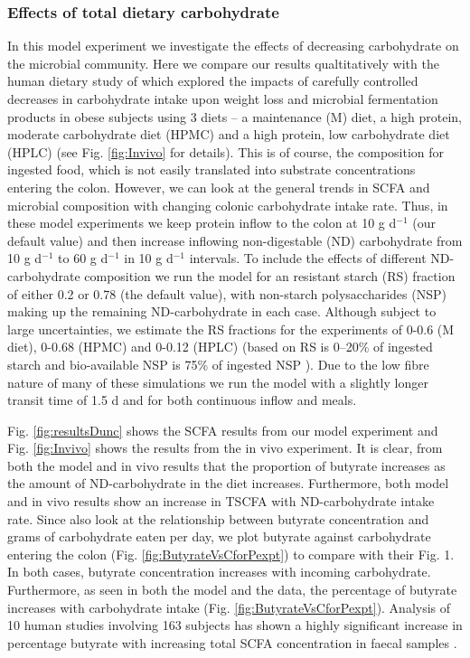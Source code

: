 \documentclass[a4paper]{article}
\begin{document}
\subsubsection*{Effects of total dietary carbohydrate}
\label{sect:protein}
In this model experiment we investigate the effects of decreasing carbohydrate on the microbial community. 
Here we compare our results qualtitatively with the human dietary study of \cite{duncan} which explored the impacts of carefully controlled decreases in carbohydrate intake upon weight loss and microbial fermentation products in obese subjects using 3 diets -- a maintenance (M) diet, a high protein, moderate carbohydrate diet (HPMC) and a high protein, low carbohydrate diet (HPLC) (see Fig. \ref{fig:Invivo} for details).
This is of course, the composition for ingested food, which is not easily translated into substrate concentrations entering the colon. 
However, we can look at the general trends in SCFA and microbial composition with changing colonic carbohydrate intake rate.
Thus, in these model experiments we keep protein inflow to the colon at 10 g d$^{-1}$ (our default value) and then increase inflowing non-digestable (ND) carbohydrate from 10 g d$^{-1}$ to 60 g d$^{-1}$ in 10 g d$^{-1}$ intervals. 
To include the effects of different ND-carbohydrate composition we run the model for an resistant starch (RS) fraction of either 0.2 or 0.78 (the default value), with non-starch polysaccharides (NSP) making up the remaining ND-carbohydrate in each case. 
Although subject to large uncertainties, we estimate the RS fractions for the \cite{duncan} experiments of 0-0.6 (M diet), 0-0.68 (HPMC) and 0-0.12 (HPLC) (based on RS is 0--20\% of ingested starch \citep{capuano} and bio-available NSP is 75\% of ingested NSP \citep{slavin}).
Due to the low fibre nature of many of these simulations we run the model with a slightly longer transit time of 1.5 d and for both continuous inflow and meals.


Fig. \ref{fig:resultsDunc} shows the SCFA results from our model experiment and Fig. \ref{fig:Invivo} shows the results from the in vivo experiment. 
It is clear, from both the model and in vivo results that the proportion of butyrate increases as the amount of ND-carbohydrate in the diet increases. Furthermore, both model and in vivo results show an increase in TSCFA with ND-carbohydrate intake rate. 
Since \cite{duncan} also look at the relationship between butyrate concentration and grams of carbohydrate eaten per day, we plot butyrate against carbohydrate entering the colon (Fig. \ref{fig:ButyrateVsCforPexpt}) to compare with their Fig. 1. 
In both cases, butyrate concentration increases with incoming carbohydrate.
Furthermore, as seen in both the model and the data, the percentage of butyrate increases with carbohydrate intake (Fig. \ref{fig:ButyrateVsCforPexpt}). 
Analysis of 10 human studies involving 163 subjects has shown a highly significant increase in percentage butyrate with increasing total SCFA concentration in faecal samples \citep{labouyer}.
\end{document}
